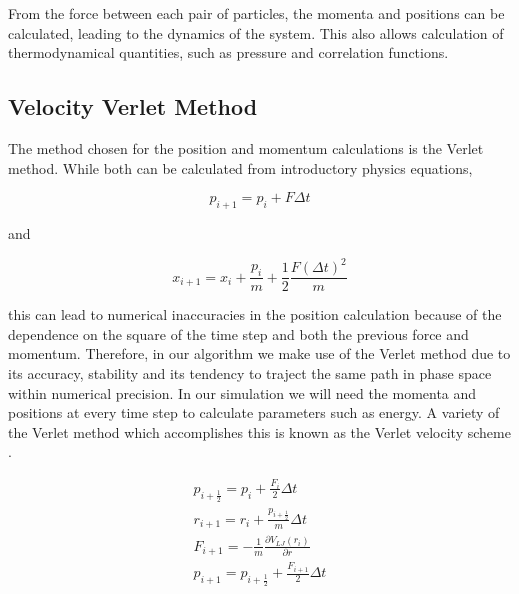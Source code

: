 \documentclass{article}
\begin{document}
\begin{multicols}{2}
\noindent From the force between each pair of particles, the momenta and positions can be calculated, leading to the dynamics of the system.  This also allows calculation of thermodynamical quantities, such as pressure and correlation functions.\\

\subsection{Velocity Verlet Method}

The method chosen for the position and momentum calculations is the Verlet method.  While both can be calculated from introductory physics equations,

\begin{equation}
\label{momeqn}
p_{i+1}=p_i + F \Delta t
\end{equation}

\noindent and

\begin{equation}
\label{poseqn}
x_{i+1} = x_i + \frac{p_i}{m} + \frac{1}{2}\frac{F(\Delta t)^2}{m}
\end{equation}

\noindent this can lead to numerical inaccuracies in the position calculation because of the dependence on the square of the time step and both the previous force and momentum. Therefore, in our algorithm we make use of the Verlet method due to its accuracy, stability and its tendency to traject the same path in phase space within numerical precision. In our simulation we will need the momenta and positions at every time step to calculate parameters such as energy. A variety of the Verlet method which accomplishes this is known as the Verlet velocity scheme \cite{verlet}.


\begin{equation}
\label{verletvscheme}
\begin{split}
p_{i+\frac{1}{2}}=p_i + \frac{F_i}{2} \Delta t \\
r_{i+1}=r_i+\frac{p_{i+\frac{1}{2}}}{m} \Delta t \\
F_{i+1}=-\frac{1}{m} \frac{\partial V_{LJ}(r_i)}{\partial r} \\
p_{i+1} = p_{i+\frac{1}{2}} + \frac{F_{i+1}}{2} \Delta t \\
\end{split}
\end{equation}


\end{multicols}
\end{document}
